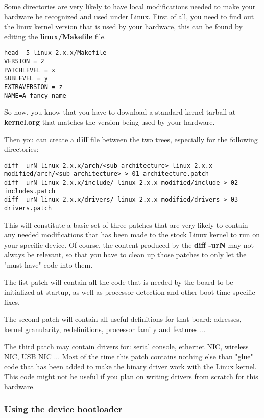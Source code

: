 Some directories are very likely to have local modifications needed to make your
hardware be recognized and used under Linux. First of all, you need to find out 
the linux kernel version that is used by your hardware, this can be found by 
editing the \textbf{linux/Makefile} file.

\begin{verbatim}
head -5 linux-2.x.x/Makefile
VERSION = 2
PATCHLEVEL = x
SUBLEVEL = y
EXTRAVERSION = z
NAME=A fancy name
\end{verbatim}

So now, you know that you have to download a standard kernel tarball at 
\textbf{kernel.org} that matches the version being used by your hardware.

Then you can create a \textbf{diff} file between the two trees, especially for the 
following directories:

\begin{verbatim}
diff -urN linux-2.x.x/arch/<sub architecture> linux-2.x.x-modified/arch/<sub architecture> > 01-architecture.patch
diff -urN linux-2.x.x/include/ linux-2.x.x-modified/include > 02-includes.patch
diff -urN linux-2.x.x/drivers/ linux-2.x.x-modified/drivers > 03-drivers.patch
\end{verbatim}

This will constitute a basic set of three patches that are very likely to contain
any needed modifications that has been made to the stock Linux kernel to run on 
your specific device. Of course, the content produced by the \textbf{diff -urN} 
may not always be relevant, so that you have to clean up those patches to only 
let the "must have" code into them.

The fist patch will contain all the code that is needed by the board to be 
initialized at startup, as well as processor detection and other boot time 
specific fixes.

The second patch will contain all useful definitions for that board: adresses, 
kernel granularity, redefinitions, processor family and features ...

The third patch may contain drivers for: serial console, ethernet NIC, wireless 
NIC, USB NIC ... Most of the time this patch contains nothing else than "glue"
code that has been added to make the binary driver work with the Linux kernel. 
This code might not be useful if you plan on writing drivers from scratch for 
this hardware.

\subsubsection{Using the device bootloader}

